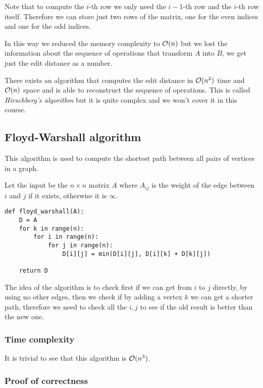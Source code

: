 \documentclass[14pt]{extarticle}
\begin{document}
Note that to compute the $i$-th row we only need the $i-1$-th row and the $i$-th row itself.
Therefore we can store just two rows of the matrix, one for the even indices and one for the odd indices.

In this way we reduced the memory complexity to $\mathcal{O}(n)$ but we lost the information about the sequence of operations that transform $A$ into $B$, we get just the edit distance as a number.

\begin{remark}
    There exists an algorithm that computes the edit distance in $\mathcal{O}(n^2)$ time and $\mathcal{O}(n)$ space and is able to reconstruct the sequence of operations. This is called \emph{Hirschberg's algorithm} but it is quite complex and we won't cover it in this course.
\end{remark}

\subsection{Floyd-Warshall algorithm}

This algorithm is used to compute the shortest path between all pairs of vertices in a graph.

Let the input be the $n \times n$ matrix $A$ where $A_{ij}$ is the weight of the edge between $i$ and $j$ if it exists, otherwise it is $\infty$.

\begin{verbatim}
def floyd_warshall(A):
    D = A
    for k in range(n):
        for i in range(n):
            for j in range(n):
                D[i][j] = min(D[i][j], D[i][k] + D[k][j])

    return D
\end{verbatim}

The idea of the algorithm is to check first if we can get from $i$ to $j$ directly, by using no other edges, then we check if by adding a vertex $k$ we can get a shorter path, therefore we need to check all the $i, j$ to see if the old result is better than the new one.

\subsubsection{Time complexity}

It is trivial to see that this algorithm is $\mathcal{O}(n^3)$.

\subsubsection{Proof of correctness}
\end{document}

